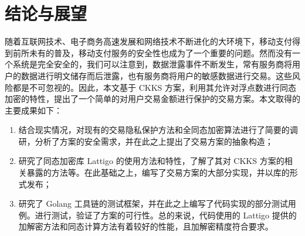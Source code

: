 \chapter{结论与展望}

随着互联网技术、电子商务高速发展和网络技术不断进化的大环境下，移动支付得到前所未有的普及，移动支付服务的安全性也成为了一个重要的问题。然而没有一个系统是完全安全的，我们可以注意到，数据泄露事件不断发生，常有服务商将用户的数据进行明文储存而后泄露，也有服务商将用户的敏感数据进行交易。这些风险都是不可忽视的。因此，本文基于 CKKS 方案，利用其允许对浮点数进行同态加密的特性，提出了一个简单的对用户交易金额进行保护的交易方案。本文取得的主要成果如下：

\begin{enumerate}
    \item 结合现实情况，对现有的交易隐私保护方法和全同态加密算法进行了简要的调研，分析了方案的安全需求，并在此之上提出了交易方案的抽象构造；
    \item 研究了同态加密库 Lattigo 的使用方法和特性，了解了其对 CKKS 方案的相关暴露的方法等。在此基础之上，编写了交易方案的大部分实现，并以库的形式发布；
    \item 研究了 Golang 工具链的测试框架，并在此之上编写了代码实现的部分测试用例。进行测试，验证了方案的可行性。总的来说，代码使用的 Lattigo 提供的加解密方法和同态计算方法有着较好的性能，且加解密精度符合要求。
\end{enumerate}
